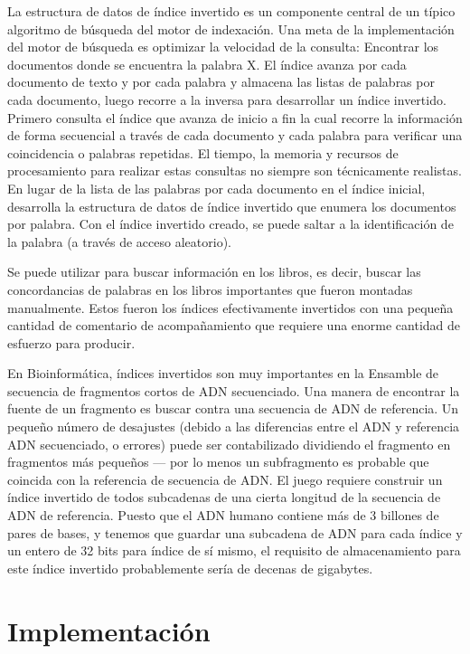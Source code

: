 \documentclass{article}
\begin{document}
La estructura de datos de ﻿índice invertido ﻿es un componente central de un típico ﻿algoritmo de búsqueda del motor de indexación﻿. Una meta de la implementación del motor de búsqueda es optimizar la velocidad de la consulta: Encontrar los documentos donde se encuentra la palabra X. El  índice avanza por cada documento de texto y por cada palabra y almacena las listas de palabras por cada documento, luego recorre a la inversa para desarrollar un índice invertido. Primero consulta el índice que avanza de inicio a fin la cual recorre la información de forma secuencial a través de cada documento y cada palabra para verificar una coincidencia o palabras repetidas. El tiempo, la memoria y recursos de procesamiento para realizar estas consultas no siempre son técnicamente realistas. En lugar de la lista de las palabras por cada documento en el índice inicial, desarrolla la estructura de datos de índice invertido que enumera los documentos por palabra. ﻿Con el índice invertido creado, se puede saltar a la identificación de la palabra (a través de ﻿acceso aleatorio﻿). \cite{salton1983extended}

﻿Se puede utilizar para buscar información en los libros, es decir, buscar las ﻿concordancias de palabras en los ﻿libros importantes que fueron montadas manualmente. Estos fueron los índices efectivamente invertidos con una pequeña cantidad de comentario de acompañamiento que requiere una enorme cantidad de esfuerzo para producir.

﻿En Bioinformática, índices invertidos son muy importantes en la Ensamble de secuencia ﻿de fragmentos cortos de ADN secuenciado. Una manera de encontrar la fuente de un fragmento es buscar contra una secuencia de ADN de referencia. Un pequeño número de desajustes (debido a las diferencias entre el ADN y referencia ADN secuenciado, o errores) puede ser contabilizado dividiendo el fragmento en fragmentos más pequeños — por lo menos un subfragmento es probable que coincida con la referencia de secuencia de ADN. El juego requiere construir un índice invertido de todos subcadenas de una cierta longitud de la secuencia de ADN de referencia. Puesto que el ADN humano contiene más de 3 billones de pares de bases, y tenemos que guardar una subcadena de ADN para cada índice y un entero de 32 bits para índice de sí mismo, el requisito de almacenamiento para este índice invertido probablemente sería de decenas de gigabytes. \cite{programmer_click}

\section{Implementación}
\end{document}
